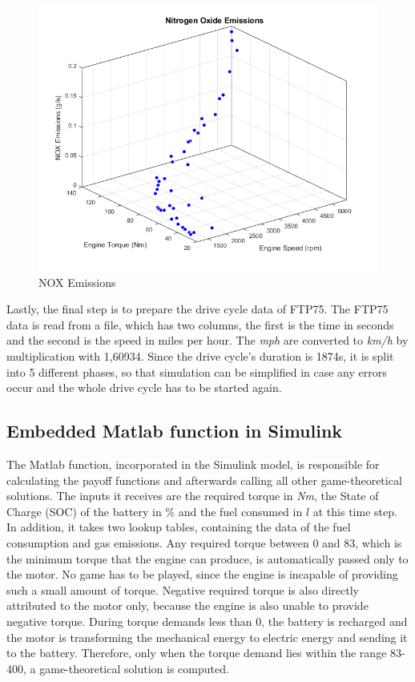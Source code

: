\begin{figure}[h]
\centering
\includegraphics[scale=0.5]{figures/NOX}
\caption{NOX Emissions}
\label{fig:noxFit}
\end{figure}

Lastly, the final step is to prepare the drive cycle data of FTP75. The FTP75 data is read from a file, which has two columns, the first is the time in seconds and the second is the speed in miles per hour. The \textit{mph} are converted to \textit{km/h} by multiplication with 1,60934. Since the drive cycle's duration is 1874s, it is split into 5 different phases, so that simulation can be simplified in case any errors occur and the whole drive cycle has to be started again. 

\subsection{Embedded Matlab function in Simulink}
The Matlab function, incorporated in the Simulink model, is responsible for calculating the payoff functions and afterwards calling all other game-theoretical solutions.
The inputs it receives are the required torque in \textit{Nm}, the State of Charge (SOC) of the battery in \% and the fuel consumed in $l$ at this time step. In addition, it takes two lookup tables, containing the data of the fuel consumption and gas emissions. Any required torque between 0 and 83, which is the minimum torque that the engine can produce, is automatically passed only to the motor. No game has to be played, since the engine is incapable of providing such a small amount of torque. Negative required torque is also directly attributed to the motor only, because the engine is also unable to provide negative torque. During torque demands less than 0, the battery is recharged and the motor is transforming the mechanical energy to electric energy and sending it to the battery. Therefore, only when the torque demand lies within the range 83-400, a game-theoretical solution is computed.


